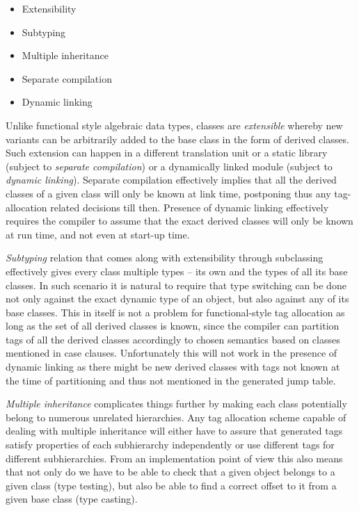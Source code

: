 \documentclass[preprint]{sigplanconf}
\begin{document}
\begin{itemize}
\item Extensibility
\item Subtyping
\item Multiple inheritance
\item Separate compilation
\item Dynamic linking 
\end{itemize}

Unlike functional style algebraic data types, classes are \emph{extensible} 
whereby new variants can be arbitrarily added to the base class in the form of 
derived classes. Such extension can happen in a different translation unit or a
static library (subject to \emph{separate compilation}) or a dynamically linked 
module (subject to \emph{dynamic linking}). Separate compilation effectively 
implies that all the derived classes of a given class will only be known at link 
time, postponing thus any tag-allocation related decisions till then.
Presence of dynamic linking effectively requires the compiler to assume that the 
exact derived classes will only be known at run time, and not even at start-up 
time.


\emph{Subtyping} relation that comes along with extensibility through 
subclassing effectively gives every class multiple types -- its own and the 
types of all its base classes. In such scenario it is natural to require that 
type switching can be done not only against the exact dynamic type of an object, 
but also against any of its base classes. This in itself is not a problem for 
functional-style tag allocation as long as the set of all derived classes is 
known, since the compiler can partition tags of all the derived classes 
accordingly to chosen semantics based on classes mentioned in case clauses. 
Unfortunately this will not work in the presence of dynamic linking as there 
might be new derived classes with tags not known at the time of partitioning and 
thus not mentioned in the generated jump table.

\emph{Multiple inheritance} complicates things further by making each class 
potentially belong to numerous unrelated hierarchies. Any tag allocation scheme 
capable of dealing with multiple inheritance will either have to assure that 
generated tags satisfy properties of each subhierarchy independently or use 
different tags for different subhierarchies. From an implementation point of 
view this also means that not only do we have to be able to check that a given 
object belongs to a given class (type testing), but also be able to find a 
correct offset to it from a given base class (type casting).
\end{document}
